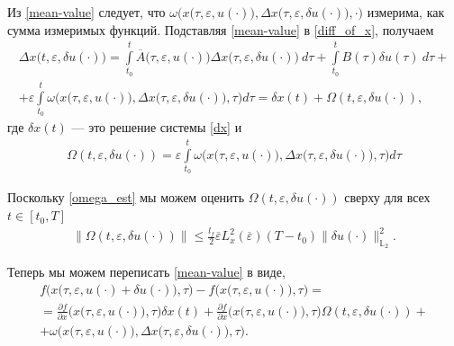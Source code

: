 \documentclass[../main.tex]{subfiles}
\begin{document}
Из \eqref{mean-value} следует, что $\omega\Big(x\big(\tau,\varepsilon, u(\cdot)\big),\Delta x\big(\tau, \varepsilon, \delta u(\cdot)\big),\cdot\big)$ измерима, как сумма измеримых функций.
Подставляя \eqref{mean-value} в \eqref{diff_of_x}, получаем
\begin{gather*}
	\Delta x\big(t, \varepsilon, \delta u(\cdot)\big)
	= \int\limits_{t_0}^t 
	\overline{A}\big(\tau,\varepsilon,u(\cdot)\big) 
	\Delta x\big(\tau, \varepsilon, \delta u(\cdot)\big)\ d\tau + 
	\int\limits_{t_0}^t B(\tau) \delta u(\tau)\ d\tau + \\ +
	\varepsilon\int\limits_{t_0}^t \omega\Big(x\big(\tau,\varepsilon, u(\cdot)\big),\Delta x\big(\tau, \varepsilon, \delta u(\cdot)\big),\tau\Big) d\tau = 
	\delta x(t) + \Omega(t,\varepsilon, \delta u(\cdot)),
\end{gather*}
где $\delta x(t)$ --- это решение системы \eqref{dx} и
\begin{gather*}
	\Omega(t,\varepsilon, \delta u(\cdot)) = \varepsilon\int\limits_{t_0}^t 
	\omega\Big(x\big(\tau,\varepsilon, u(\cdot)\big),\Delta x\big(\tau, \varepsilon, \delta u(\cdot)\big),\tau\Big) d\tau
\end{gather*}


Поскольку \eqref{omega_est} мы можем оценить $\Omega(t,\varepsilon, \delta u(\cdot)) $ сверху для всех $t \in [t_0, T]$
\begin{gather}
	\| \Omega(t,\varepsilon, \delta u(\cdot))\| \leqslant \frac{l_f}{2} \overline{\varepsilon} L_x^2(\overline{\varepsilon})(T-t_0)\|\delta u(\cdot)\|_{\mathbb{L}_2}^2.
\end{gather}

Теперь мы можем переписать \eqref{mean-value} в виде,  
\begin{gather*}
	f\Big(x\big(\tau,\varepsilon, u(\cdot) + \delta u(\cdot)\big),\tau\Big) -
	f\Big(x\big(\tau,\varepsilon, u(\cdot)\big),\tau\Big) = \\ =
	\frac{\partial f}{\partial x}  \Big(x\big(\tau,\varepsilon, u(\cdot)\big), \tau\Big) \delta x(t) + 
	\frac{\partial f}{\partial x} \Big(x\big(\tau,\varepsilon, u(\cdot)\big), \tau\Big) \Omega(t,\varepsilon, \delta u(\cdot))
	+ \\ + 
	\omega\Big(x\big(\tau,\varepsilon, u(\cdot)\big),\Delta x\big(\tau, \varepsilon, \delta u(\cdot)\big),\tau\Big).
\end{gather*}
\end{document}
